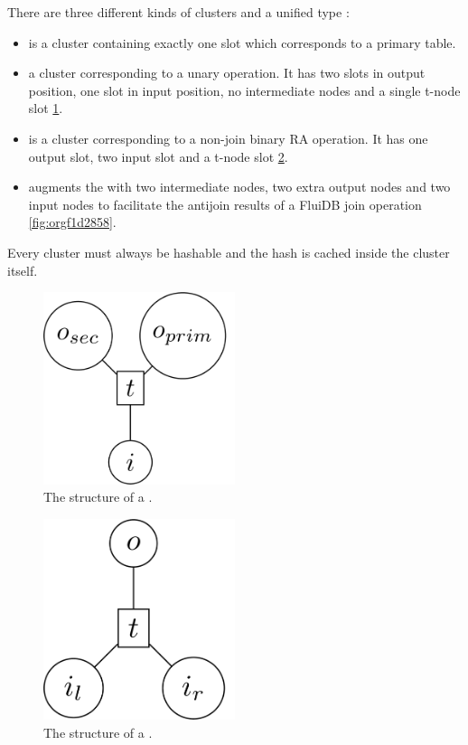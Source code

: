 There are three different kinds of clusters and a unified type
:

\begin{itemize}
\item {} is a cluster containing exactly one slot which corresponds
  to a primary table.
\item {} a cluster corresponding to a unary operation. It has two
  slots in output position, one slot in input position, no
  intermediate nodes and a single t-node slot \ref{fig:org8d8d9a2}.
\item {} is a cluster corresponding to a non-join binary RA
  operation. It has one output slot, two input slot and a t-node slot
  \ref{fig:org71a57f1}.
\item {} augments the  with two intermediate nodes, two
  extra output nodes and two input nodes to facilitate the antijoin
  results of a FluiDB join operation \ref{fig:orgf1d2858}.
\end{itemize}

Every cluster must always be hashable and the hash is cached inside
the cluster itself.

\begin{figure}[H]
  \centering
  \includegraphics[width=0.5\textwidth]{./imgs/unclust.pdf}
  \caption{\label{fig:org8d8d9a2}The structure of a .}
\end{figure}


\begin{figure}[H]
  \centering
  \includegraphics[width=0.5\textwidth]{./imgs/binclust.pdf}
  \caption{\label{fig:org71a57f1}The structure of a .}
\end{figure}


